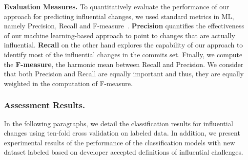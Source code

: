 \textbf{Evaluation Measures.}
To quantitatively evaluate the performance of our approach for predicting influential changes,
we used standard metrics in ML, namely Precision, Recall and
F-measure~\cite{mlbook,kim_classifying_2008,stat2}. {\bf Precision} quantifies the effectiveness of our machine learning-based approach to point to changes that are actually influential. {\bf Recall} on the other hand explores the capability of our approach to identify most of the influential changes in the commits set. Finally, we compute the {\bf F-measure}, the harmonic mean between Recall and Precision. We consider that both Precision and Recall are equally important and thus, they are equally weighted in the computation of F-measure.


\subsubsection{Assessment Results.}
In the following paragraphs, we detail the classification results for
influential changes using ten-fold cross validation on labeled
data. In addition, we present experimental results of the performance of the classification models with new dataset labeled based on developer accepted definitions of influential challenges.


